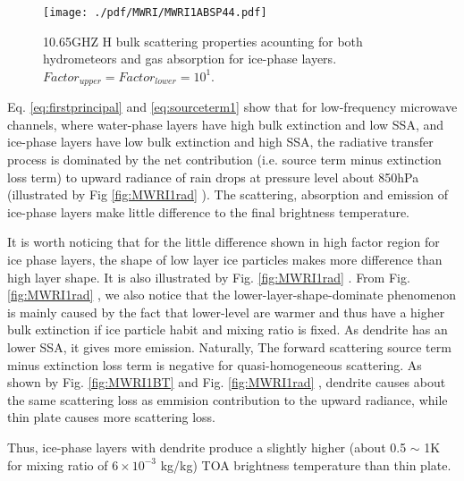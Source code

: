 \begin{figure}[hbtp] 
\centering
\texttt{[image: ./pdf/MWRI/MWRI1ABSP44.pdf]}
\caption{10.65GHZ H bulk scattering properties acounting for both hydrometeors and gas absorption for ice-phase layers.
$Factor_{upper} = Factor_{lower} = 10^{1}$.}
\label{fig:MWRI1ABSP44}
\end{figure}

Eq. \ref{eq:firstprincipal} and \ref{eq:sourceterm1} show that for low-frequency microwave channels, where water-phase layers have high bulk extinction and low SSA,
and ice-phase layers have low bulk extinction and high SSA, the radiative transfer process is dominated by the net contribution (i.e. source term minus extinction loss term) to 
upward radiance of rain drops at pressure level about 850hPa (illustrated by Fig \ref{fig:MWRI1rad} ). 
The scattering, absorption and emission of ice-phase layers make little difference to the final brightness temperature.

It is worth noticing that for the little difference shown in high factor region for ice phase layers, the shape of low layer ice particles
makes more difference than high layer shape. It is also illustrated by Fig. \ref{fig:MWRI1rad} .
From Fig. \ref{fig:MWRI1rad} , we also notice that the lower-layer-shape-dominate phenomenon is mainly 
caused by the fact that lower-level are warmer and thus have a higher bulk extinction if ice particle habit and mixing ratio is fixed. 
As dendrite has an lower SSA, it gives more emission.
Naturally, The forward scattering source term minus extinction loss term is negative for quasi-homogeneous scattering.
As shown by Fig. \ref{fig:MWRI1BT} and Fig. \ref{fig:MWRI1rad} , dendrite causes about the same scattering loss as emmision contribution
to the upward radiance, while thin plate causes more scattering loss.

Thus, ice-phase layers with dendrite produce a slightly higher (about 0.5 $\sim$ 1K for mixing ratio of $6 \times 10^{-3}$ kg/kg) TOA brightness temperature
than thin plate.



